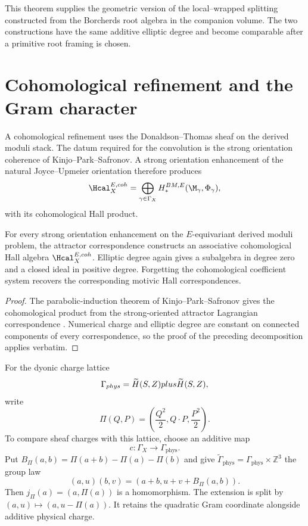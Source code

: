 This theorem supplies the geometric version of the local--wrapped splitting constructed from the Borcherds root algebra in the companion volume.  The two constructions have the same additive elliptic degree and become comparable after a primitive root framing is chosen.

\chapter{Cohomological refinement and the Gram character}
A cohomological refinement uses the Donaldson--Thomas sheaf on the derived moduli stack.  The datum required for the convolution is the strong orientation coherence of Kinjo--Park--Safronov.  A strong orientation enhancement of the natural Joyce--Upmeier orientation therefore produces
\[
 \Hcal_X^{E,\mathrm{coh}}
 =\widehat\bigoplus_{\gamma\in\Gamma_X}
 H_*^{\mathrm{BM},E}(\M_\gamma,\Phi_\gamma),
\]
with its cohomological Hall product.

\begin{theorem}
For every strong orientation enhancement on the $E$-equivariant derived moduli problem, the attractor correspondence constructs an associative cohomological Hall algebra $\Hcal_X^{E,\mathrm{coh}}$.  Elliptic degree again gives a subalgebra in degree zero and a closed ideal in positive degree.  Forgetting the cohomological coefficient system recovers the corresponding motivic Hall correspondences.
\end{theorem}
\begin{proof}
The parabolic-induction theorem of Kinjo--Park--Safronov gives the cohomological product from the strong-oriented attractor Lagrangian correspondence \cite{KPS}.  Numerical charge and elliptic degree are constant on connected components of every correspondence, so the proof of the preceding decomposition applies verbatim.
\end{proof}

For the dyonic charge lattice
\[
 \Gamma_{phys}
 =\widetilde H(S,Z)plus\widetilde H(S,Z),
\]
write
\[
 \Pi(Q,P)=\left(\frac{Q^2}{2},Q\cdot P,\frac{P^2}{2}\right).
\]
To compare sheaf charges with this lattice, choose an additive map
\[
 c:\Gamma_X\longrightarrow\Gamma_{\mathrm{phys}}.
\]
Put $B_\Pi(a,b)=\Pi(a+b)-\Pi(a)-\Pi(b)$ and give
$\widetilde\Gamma_{\mathrm{phys}}=\Gamma_{\mathrm{phys}}\times\mathbb Z^3$
the group law
\[
 (a,u)(b,v)=(a+b,u+v+B_\Pi(a,b)).
\]
Then $j_\Pi(a)=(a,\Pi(a))$ is a homomorphism.
The extension is split by $(a,u)\mapsto(a,u-\Pi(a))$. It retains the quadratic Gram coordinate alongside additive physical charge.

